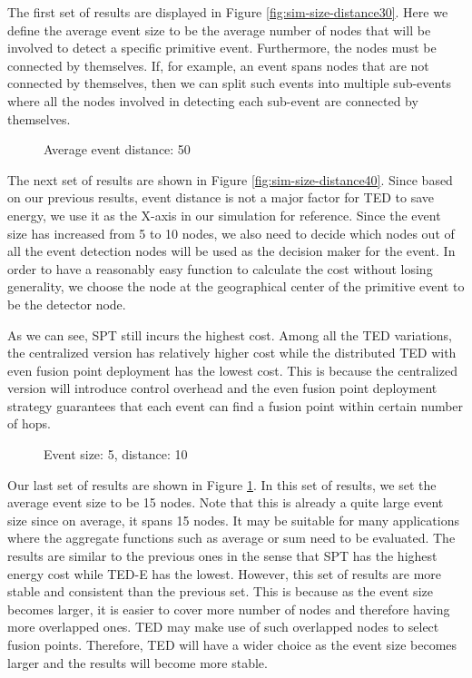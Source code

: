The first set of results are displayed in Figure \ref{fig:sim-size-distance30}. Here we define the average event size to be the average number of nodes that will be involved to detect a specific primitive event. Furthermore, the nodes must be connected by themselves. If, for example, an event spans nodes that are not connected by themselves, then we can split such events into multiple sub-events where all the nodes involved in detecting each sub-event are connected by themselves.

\begin{figure}
\centering
{}
\caption{Average event distance: 50}
\label{fig:sim-size-distance50}
\end{figure}

The next set of results are shown in Figure \ref{fig:sim-size-distance40}. Since based on our previous results, event distance is not a major factor for TED to save energy, we use it as the X-axis in our simulation for reference. Since the event size has increased from 5 to 10 nodes, we also need to decide which nodes out of all the event detection nodes will be used as the decision maker for the event. In order to have a reasonably easy function to calculate the cost without losing generality, we choose the node at the geographical center of the primitive event to be the detector node.

As we can see, SPT still incurs the highest cost. Among all the TED variations, the centralized version has relatively higher cost while the distributed TED with even fusion point deployment has the lowest cost. This is because the centralized version will introduce control overhead and the even fusion point deployment strategy guarantees that each event can find a fusion point within certain number of hops.

\begin{figure}
\centering
{}
\caption{Event size: 5, distance: 10}
\label{fig:sim-prob-size5-dist10}
\end{figure}

Our last set of results are shown in Figure \ref{fig:sim-size-distance50}. In this set of results, we set the average event size to be 15 nodes. Note that this is already a quite large event size since on average, it spans 15 nodes. It may be suitable for many applications where the aggregate functions such as average or sum need to be evaluated. The results are similar to the previous ones in the sense that SPT has the highest energy cost while TED-E has the lowest. However, this set of results are more stable and consistent than the previous set. This is because as the event size becomes larger, it is easier to cover more number of nodes and therefore having more overlapped ones. TED may make use of such overlapped nodes to select fusion points. Therefore, TED will have a wider choice as the event size becomes larger and the results will become more stable.

